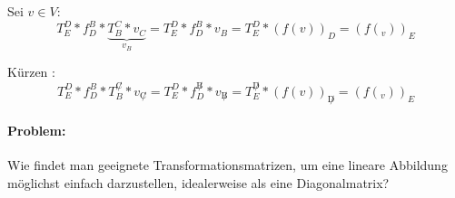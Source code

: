 \begin{beweis}{}
	Sei $v\in V$:
	\begin{equation*}
		T_E^D*f^B_D* \underbrace{T_B^C*v_C}_{v_B}=T_E^D*f_D^B*v_B=T^D_E*\left(f(v)\right)_D = \left(f(_v)\right)_E
	\end{equation*}
\end{beweis}

\merkregel \glqq Kürzen \grqq:
\begin{equation*}
	T_E^D*f^B_D*T_B^{\not C}*v_{\not C}=T_E^D*f_D^{\not B}*v_{\not B}=T^{\not D}_E*\left(f(v)\right)_{\not D} = \left(f(_v)\right)_E
\end{equation*}


\paragraph{Problem:}
Wie findet man geeignete Transformationsmatrizen, um eine lineare Abbildung möglichst einfach darzustellen, idealerweise als eine Diagonalmatrix?
